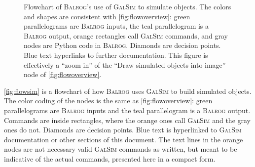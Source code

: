 \documentclass[11pt]{book}
\newcommand{\py}{Python}
\newcommand{\galsim}{\textsc{GalSim}}
\newcommand{\balrog}{\textsc{Balrog}}
\begin{document}
\begin{figure}
\caption{Flowchart of \balrog{}'s use of \galsim{} to simulate objects.
The colors and shapes are consistent with \autoref{fig:flowoverview}:
green parallelograms are \balrog{} inputs, the teal parallelogram is a \balrog{} output,
orange rectangles call \galsim{} commands, and gray nodes are \py{} code in \balrog{}.
Diamonds are decision points.
Blue text hyperlinks to further documentation.
This figure is effectively a ``zoom in'' of the ``Draw simulated objects into image'' node of \autoref{fig:flowoverview}.}
\label{fig:flowsim}
\end{figure}


\autoref{fig:flowsim} is a flowchart of how \balrog{} uses \galsim{} to build simulated objects.
The color coding of the nodes is the same as \autoref{fig:flowoverview}:
green parallelograms are \balrog{} inputs and the teal parallelogram is a \balrog{} output.
Commands are inside rectangles, where the orange ones call \galsim{} and the gray ones do not.
Diamonds are decision points.
Blue text is hyperlinked to \galsim{} documentation or other sections of this document.
The text lines in the orange nodes are not necessary valid \galsim{} commands as written, 
but meant to be indicative of the actual commands, presented here in a compact form.
\end{document}
